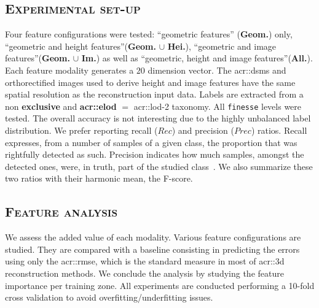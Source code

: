     \subsection{\textsc{Experimental set-up}}
        \label{subsec::experiments::evaluation::setup}
        Four feature configurations were tested: ``geometric features'' (\textbf{Geom.}) only, ``geometric and height features''(\textbf{Geom.} $\cup$ \textbf{Hei.}), ``geometric and image features''(\textbf{Geom.} $\cup$ \textbf{Im.}) as well as ``geometric, height and image features''(\textbf{All.}).
        Each feature modality generates a $20$ dimension vector.
        The \glspl{acr::dsm} and orthorectified images used to derive height and image features have the same spatial resolution as the reconstruction input data.
        Labels are extracted from a non \textbf{exclusive} and \textbf{\gls{acr::elod}} $=$ \gls{acr::lod}-2 taxonomy.
        All \texttt{finesse} levels were tested. The overall accuracy is not interesting due to the highly unbalanced label distribution.
        We prefer reporting recall ($Rec$) and precision ($Prec$) ratios.
        Recall expresses, from a number of samples of a given class, the proportion that was rightfully detected as such.
        Precision indicates how much samples, amongst the detected ones, were, in truth, part of the studied class~\parencite{powers2011evaluation}.
        We also summarize these two ratios with their harmonic mean, the F-score.

    \subsection{\textsc{Feature analysis}}
        \label{subsec::experiments::evaluation::feature_analysis}
        We assess the added value of each modality. Various feature configurations are studied.
        They are compared with a baseline consisting in predicting the errors using only the \gls{acr::rmse}, which is the standard measure in most of \gls{acr::3d} reconstruction methods.
        We conclude the analysis by studying the feature importance per training zone.
        All experiments are conducted performing a 10-fold cross validation to avoid overfitting/underfitting issues.

